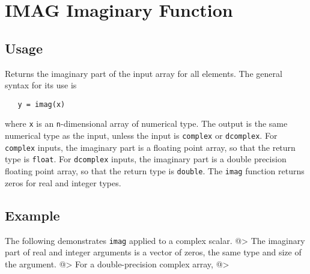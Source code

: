 \section{IMAG Imaginary Function}

\subsection{Usage}

Returns the imaginary part of the input array for all elements.  The 
general syntax for its use is
\begin{verbatim}
   y = imag(x)
\end{verbatim}
where \verb|x| is an \verb|n|-dimensional array of numerical type.  The output 
is the same numerical type as the input, unless the input is \verb|complex|
or \verb|dcomplex|.  For \verb|complex| inputs, the imaginary part is a floating
point array, so that the return type is \verb|float|.  For \verb|dcomplex|
inputs, the imaginary part is a double precision floating point array, so that
the return type is \verb|double|.  The \verb|imag| function returns zeros for 
real and integer types.
\subsection{Example}

The following demonstrates \verb|imag| applied to a complex scalar.
@>
The imaginary part of real and integer arguments is a vector of zeros, the
same type and size of the argument.
@>
For a double-precision complex array,
@>
